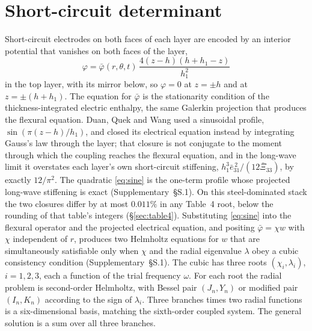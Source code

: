 \documentclass[11pt]{article}
\newcommand{\eebar}{\bar{e}_{31}}
\newcommand{\Xibar}{\bar{\Xi}_{33}}
\begin{document}
\section{Short-circuit determinant}\label{sec:sc}
Short-circuit electrodes on both faces of each layer are encoded by an
interior potential that vanishes on both faces of the layer,
\begin{equation}
\varphi=\bar\varphi(r,\theta,t)\,\frac{4(z-h)(h+h_1-z)}{h_1^2}
\label{eq:sine}
\end{equation}
in the top layer, with its mirror below, so $\varphi=0$ at $z=\pm h$ and
at $z=\pm(h+h_1)$. The equation for $\bar\varphi$ is the stationarity
condition of the thickness-integrated electric enthalpy, the same
Galerkin projection that produces the flexural equation. Duan, Quek and
Wang \cite{duan2005} used a sinusoidal profile,
$\sin(\pi(z-h)/h_1)$, and closed its electrical equation instead by
integrating Gauss's law through the layer; that closure is not conjugate
to the moment through which the coupling reaches the flexural equation,
and in the long-wave limit it overstates each layer's own short-circuit
stiffening, $h_1^3\eebar^{\,2}/(12\Xibar)$, by exactly $12/\pi^2$. The
quadratic \eqref{eq:sine} is the one-term profile whose projected
long-wave stiffening is exact (Supplementary~\S S.1). On this
steel-dominated stack the two closures differ by at most $0.011\%$ in
any Table~4 root, below the rounding of that table's integers
(\S\ref{sec:table4}). Substituting
\eqref{eq:sine} into the flexural operator and the projected electrical
equation, and positing
$\bar\varphi=\chi w$ with $\chi$ independent of $r$, produces two
Helmholtz equations for $w$ that are simultaneously satisfiable only
when $\chi$ and the radial eigenvalue $\lambda$ obey a cubic consistency
condition (Supplementary~\S S.1). The cubic has three roots
$(\chi_i,\lambda_i)$, $i=1,2,3$, each a function of the trial frequency
$\omega$. For each root the radial problem is second-order Helmholtz,
with Bessel pair $(J_n,Y_n)$ or modified pair $(I_n,K_n)$ according to
the sign of $\lambda_i$. Three branches times two radial functions is a
six-dimensional basis, matching the sixth-order coupled system. The
general solution is a sum over all three branches.
\end{document}
